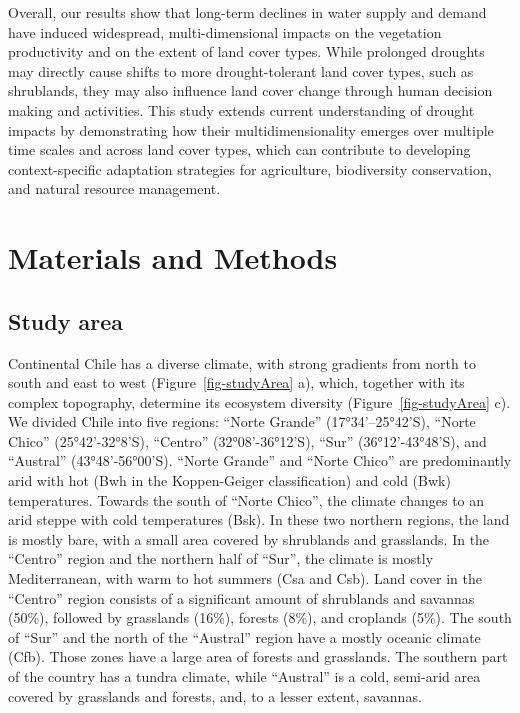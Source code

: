 \documentclass[
  sn-nature,
  numbered]{sn-jnl}
\begin{document}
Overall, our results show that long-term declines in water supply and
demand have induced widespread, multi-dimensional impacts on the
vegetation productivity and on the extent of land cover types. While
prolonged droughts may directly cause shifts to more drought-tolerant
land cover types, such as shrublands, they may also influence land cover
change through human decision making and activities. This study extends
current understanding of drought impacts by demonstrating how their
multidimensionality emerges over multiple time scales and across land
cover types, which can contribute to developing context-specific
adaptation strategies for agriculture, biodiversity conservation, and
natural resource management.

\section{Materials and Methods}\label{materials-and-methods}

\subsection{Study area}\label{study-area}

Continental Chile has a diverse climate, with strong gradients from
north to south and east to west \citep{Aceituno2021}
(Figure~\ref{fig-studyArea} a), which, together with its complex
topography, determine its ecosystem diversity
\citep{Garreaud2009, Luebert2022} (Figure~\ref{fig-studyArea} c). We
divided Chile into five regions: ``Norte Grande'' (17°34'--25°42'S),
``Norte Chico'' (25°42'-32°8'S), ``Centro'' (32°08'-36°12'S), ``Sur''
(36°12'-43°48'S), and ``Austral'' (43°48'-56°00'S). ``Norte Grande'' and
``Norte Chico'' are predominantly arid with hot (Bwh in the
Koppen-Geiger classification) and cold (Bwk) temperatures. Towards the
south of ``Norte Chico'', the climate changes to an arid steppe with
cold temperatures (Bsk). In these two northern regions, the land is
mostly bare, with a small area covered by shrublands and grasslands. In
the ``Centro'' region and the northern half of ``Sur'', the climate is
mostly Mediterranean, with warm to hot summers (Csa and Csb). Land cover
in the ``Centro'' region consists of a significant amount of shrublands
and savannas (50\%), followed by grasslands (16\%), forests (8\%), and
croplands (5\%). The south of ``Sur'' and the north of the ``Austral''
region have a mostly oceanic climate (Cfb). Those zones have a large
area of forests and grasslands. The southern part of the country has a
tundra climate, while ``Austral'' is a cold, semi-arid area covered by
grasslands and forests, and, to a lesser extent, savannas.
\end{document}
